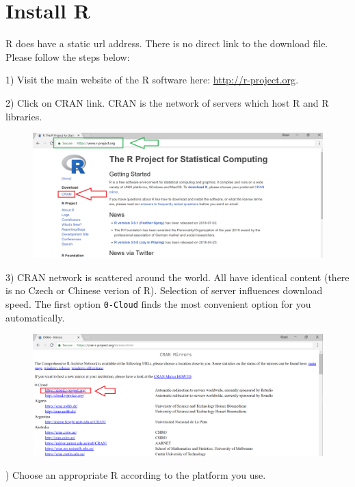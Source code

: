 \documentclass{article}\usepackage[]{graphicx}\usepackage[]{color}
\begin{document}
\setlength{\parindent}{0cm}


\section{Install R}

R does have a static url address. There is no direct link to the download file. Please follow the steps below:\bigskip

1) Visit the main website  of the R software here: \url{http://r-project.org}.\bigskip

2) Click on CRAN link. CRAN is the network of servers which host R and R libraries.

\begin{figure}[!h]
 \includegraphics[width=\textwidth,height=\textheight,keepaspectratio]{./Images/image_01.png}
\end{figure}

3) CRAN network is scattered around the world. All have identical content (there is no Czech or Chinese verion of R). Selection of server influences download speed. The first option \texttt{0-Cloud} finds the most convenient option for you automatically.

\begin{figure}[!h]
 \includegraphics[width=\textwidth,height=\textheight,keepaspectratio]{./Images/image_02.png}
\end{figure}
) Choose an appropriate R according to the platform you use. 
\end{document}
